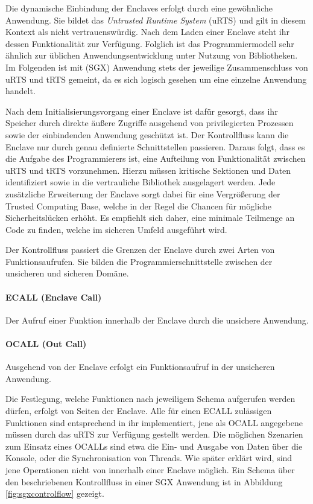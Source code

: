 Die dynamische Einbindung der Enclaves erfolgt durch eine gewöhnliche Anwendung. Sie bildet das \textit{Untrusted Runtime System} (uRTS) und gilt in diesem Kontext als nicht vertrauenswürdig. Nach dem Laden einer Enclave steht ihr dessen Funktionalität zur Verfügung. Folglich ist das Programmiermodell sehr ähnlich zur üblichen Anwendungsentwicklung unter Nutzung von Bibliotheken. Im Folgenden ist mit (SGX) Anwendung stets der jeweilige Zusammenschluss von uRTS und tRTS gemeint, da es sich logisch gesehen um eine einzelne Anwendung handelt.

Nach dem Initialisierungsvorgang einer Enclave ist dafür gesorgt, dass ihr Speicher durch direkte äußere Zugriffe ausgehend von privilegierten Prozessen sowie der einbindenden Anwendung geschützt ist. Der Kontrollfluss kann die Enclave nur durch genau definierte Schnittstellen passieren. Daraus folgt, dass es die Aufgabe des Programmierers ist, eine Aufteilung von Funktionalität zwischen uRTS und tRTS vorzunehmen. Hierzu müssen kritische Sektionen und Daten identifiziert sowie in die vertrauliche Bibliothek ausgelagert werden. Jede zusätzliche Erweiterung der Enclave sorgt dabei für eine Vergrößerung der Trusted Computing Base, welche in der Regel die Chancen für mögliche Sicherheitslücken erhöht. Es empfiehlt sich daher, eine minimale Teilmenge an Code zu finden, welche im sicheren Umfeld ausgeführt wird. 

Der Kontrollfluss passiert die Grenzen der Enclave durch zwei Arten von Funktionsaufrufen. Sie bilden die Programmierschnittstelle zwischen der unsicheren und sicheren Domäne.

\paragraph{ECALL (Enclave Call) } Der Aufruf einer Funktion innerhalb der Enclave durch die unsichere Anwendung.

\paragraph{OCALL (Out Call)} Ausgehend von der Enclave erfolgt ein Funktionsaufruf in der unsicheren Anwendung.

Die Festlegung, welche Funktionen nach jeweiligem Schema aufgerufen werden dürfen, erfolgt von Seiten der Enclave. Alle für einen ECALL zulässigen Funktionen sind entsprechend in ihr implementiert, jene als OCALL angegebene müssen durch das uRTS zur Verfügung gestellt werden. Die möglichen Szenarien zum Einsatz eines OCALLs sind etwa die Ein- und Ausgabe von Daten über die Konsole, oder die Synchronisation von Threads. Wie später erklärt wird, sind jene Operationen nicht von innerhalb einer Enclave möglich. Ein Schema über den beschriebenen Kontrollfluss in einer SGX Anwendung ist in Abbildung \ref{fig:sgxcontrolflow} gezeigt.

